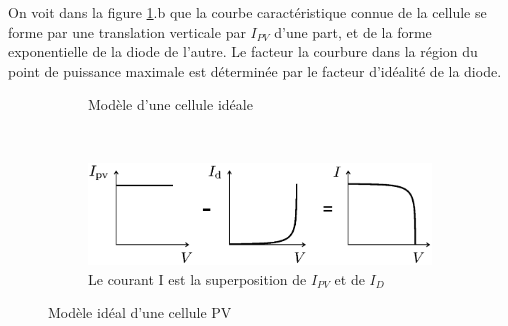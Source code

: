 On voit dans la figure \ref{fig:idealcell}.b que la courbe caractéristique connue de la cellule se forme par une translation verticale par $I_{PV}$ d'une part, et de la forme exponentielle de la diode de l'autre. Le facteur la courbure dans la région du point de puissance maximale est déterminée par le facteur d'idéalité de la diode.



\begin{figure}[t!]
  \centering
  \begin{subfigure}[b]{0.3\textwidth}
      \centering
      \shorthandoff{:!}
      \shorthandon{:!}
      \caption{Modèle d'une cellule idéale}

  \end{subfigure}
  ~
  \begin{subfigure}[b]{0.65\textwidth}
      \centering
      \includegraphics[width=\textwidth]{resources/superp.png}
      \caption{Le courant I est la superposition de $I_{PV}$ et de $I_D$ \cite{Villalva2009}}
  \end{subfigure}
  \caption{Modèle idéal d'une cellule PV}
  \label{fig:idealcell}
\end{figure}


